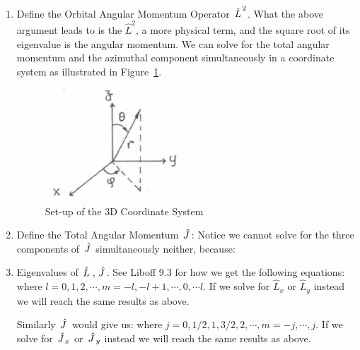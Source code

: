 \documentclass{school-22.101-notes}
\begin{document}
\begin{enumerate}
\item Define the Orbital Angular Momentum Operator $\left. \hat{L} \right.^2$. 
What the above argument leads to is the $\hat{L}^2$,  a more physical term, and the square root of its eigenvalue is the angular momentum. 
We can solve for the total angular momentum and the azimuthal component simultaneously in a coordinate system as illustrated in Figure~\ref{3DCS}. 
\begin{figure}
    \centering
    \includegraphics[width=2in]{images/qm/3DCS.png}
    \caption{Set-up of the 3D Coordinate System\label{3DCS}}
\end{figure}

\item Define the Total Angular Momentum $\left. \hat{J} \right.$:
\eqn{ \Jhat = \Lhat + \Shat }
Notice we cannot solve for the three components of $\left. \hat{J} \right.$ simultaneously neither, because: 


\item Eigenvalues of $\left. \hat{L} \right., \left. \hat{J} \right.$. 
See Liboff 9.3 for how we get the following equations: 
where $l = 0,1,2, \cdots, m = -l, -l+1, \cdots, 0, \cdots l$. If we solve for $\hat{L}_x$ or $\hat{L}_y$ instead we will reach the same results as above. 

Similarly $\left. \hat{J} \right.$ would give us:
where $j = 0,1/2,1,3/2,2, \cdots, m = -j, \cdots, j$. If we solve for $\left. \hat{J} \right._x$ or $\left. \hat{J} \right._y$ instead we will reach the same results as above. 


\end{enumerate}
\end{document}
